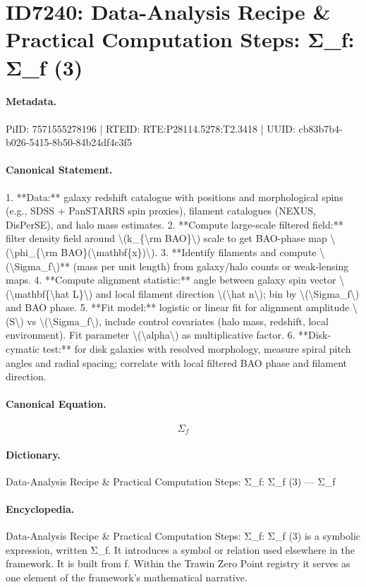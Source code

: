 \section*{ID7240: Data-Analysis Recipe \& Practical Computation Steps: Σ\_f: Σ\_f (3)}
\paragraph{Metadata.}
PiID: 7571555278196 | RTEID: RTE:P28114.5278:T2.3418 | UUID: cb83b7b4-b026-5415-8b50-84b24df4c3f5

\paragraph{Canonical Statement.}
1. **Data:** galaxy redshift catalogue with positions and morphological spins (e.g., SDSS + PanSTARRS spin proxies), filament catalogues (NEXUS, DisPerSE), and halo mass estimates. 2. **Compute large-scale filtered field:** filter density field around \textbackslash{}(k\_\{\textbackslash{}rm BAO\}\textbackslash{}) scale to get BAO-phase map \textbackslash{}(\textbackslash{}phi\_\{\textbackslash{}rm BAO\}(\textbackslash{}mathbf\{x\})\textbackslash{}). 3. **Identify filaments and compute \textbackslash{}(\textbackslash{}Sigma\_f\textbackslash{})** (mass per unit length) from galaxy/halo counts or weak-lensing maps. 4. **Compute alignment statistic:** angle between galaxy spin vector \textbackslash{}(\textbackslash{}mathbf\{\textbackslash{}hat L\}\textbackslash{}) and local filament direction \textbackslash{}(\textbackslash{}hat n\textbackslash{}); bin by \textbackslash{}(\textbackslash{}Sigma\_f\textbackslash{}) and BAO phase. 5. **Fit model:** logistic or linear fit for alignment amplitude \textbackslash{}(S\textbackslash{}) vs \textbackslash{}(\textbackslash{}Sigma\_f\textbackslash{}), include control covariates (halo mass, redshift, local environment). Fit parameter \textbackslash{}(\textbackslash{}alpha\textbackslash{}) as multiplicative factor. 6. **Disk-cymatic test:** for disk galaxies with resolved morphology, measure spiral pitch angles and radial spacing; correlate with local filtered BAO phase and filament direction.

\paragraph{Canonical Equation.}
\[
\Sigma_f
\]

\paragraph{Dictionary.}
Data-Analysis Recipe \& Practical Computation Steps: Σ\_f: Σ\_f (3) — Σ\_f

\paragraph{Encyclopedia.}
Data-Analysis Recipe \& Practical Computation Steps: Σ\_f: Σ\_f (3) is a symbolic expression, written Σ\_f. It introduces a symbol or relation used elsewhere in the framework. It is built from f. Within the Trawin Zero Point registry it serves as one element of the framework's mathematical narrative.
